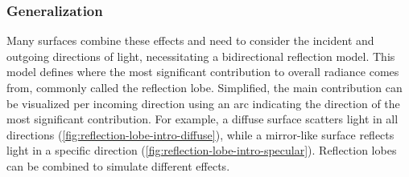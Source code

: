 \subsubsection{Generalization}
\label{sec:physics-generalization}

Many surfaces combine these effects and need to consider the incident and outgoing directions of light, necessitating a bidirectional reflection model. This model defines where the most significant contribution to overall radiance comes from, commonly called the reflection lobe. Simplified, the main contribution can be visualized per incoming direction using an arc indicating the direction of the most significant contribution. For example, a diffuse surface scatters light in all directions (\autoref{fig:reflection-lobe-intro-diffuse}), while a mirror-like surface reflects light in a specific direction (\autoref{fig:reflection-lobe-intro-specular}). Reflection lobes can be combined to simulate different effects.


